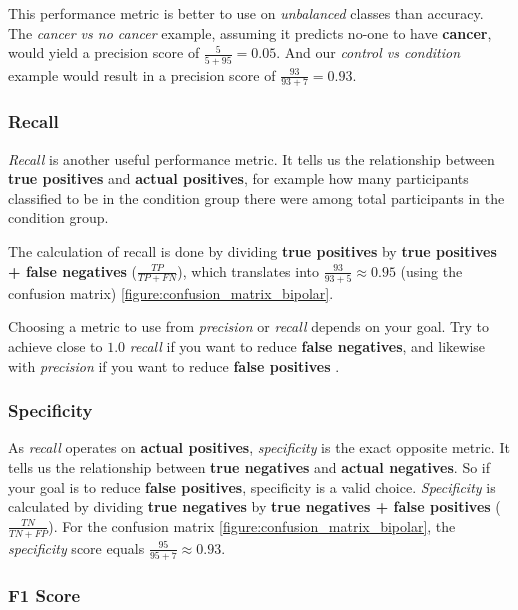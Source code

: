 This performance metric is better to use on \textit{unbalanced} classes than accuracy. The \textit{cancer vs no cancer} example, assuming it predicts no-one to have \textbf{cancer}, would yield a precision score of $ \frac{5}{5+95} = 0.05 $. And our \textit{control vs condition} example would result in a precision score of $ \frac{93}{93+7} = 0.93 $.

\subsubsection{Recall}

\textit{Recall} is another useful performance metric. It tells us the relationship between \textbf{true positives} and \textbf{actual positives}, for example how many participants classified to be in the condition group there were among total participants in the condition group.

The calculation of recall is done by dividing \textbf{true positives} by \textbf{true positives + false negatives} ($ \frac{TP}{TP+FN} $), which translates into $ \frac{93}{93+5} \approx 0.95 $ (using the confusion matrix) \ref{figure:confusion_matrix_bipolar}.

Choosing a metric to use from \textit{precision} or \textit{recall} depends on your goal. Try to achieve close to $ 1.0 $ \textit{recall} if you want to reduce \textbf{false negatives}, and likewise with \textit{precision} if you want to reduce \textbf{false positives} \cite{ml_metrics}.

\subsubsection{Specificity}

As \textit{recall} operates on \textbf{actual positives}, \textit{specificity} is the exact opposite metric. It tells us the relationship between \textbf{true negatives} and \textbf{actual negatives}. So if your goal is to reduce \textbf{false positives}, specificity is a valid choice. \textit{Specificity} is calculated by dividing \textbf{true negatives} by \textbf{true negatives + false positives} ($ \frac{TN}{TN+FP} $). For the confusion matrix \ref{figure:confusion_matrix_bipolar}, the \textit{specificity} score equals $ \frac{95}{95+7} \approx 0.93 $.

\subsubsection{F1 Score}

